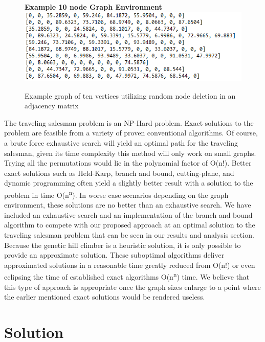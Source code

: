 \documentclass[sigplan,screen]{acmart}
\begin{document}
\begin{figure}[h]
    \centering
    \textbf{Example 10 node Graph Environment}
    \includegraphics[width=\columnwidth]{assets/graph.png}
    \caption{Example graph of ten vertices utilizing random node deletion in an adjacency matrix}
    \label{fig:example_graph}
\end{figure}

The traveling salesman problem is an NP-Hard problem. Exact solutions to the
problem are feasible from a variety of proven conventional algorithms. Of
course, a brute force exhaustive search will yield an optimal path for the
traveling salesman, given its time complexity this method will only work on
small graphs. Trying all the permutations would lie in the polynomial factor of
O(n!). Better exact solutions such as Held-Karp, branch and bound,
cutting-plane, and dynamic programming often yield a slightly better result with
a solution to the problem in time O(n\textsuperscript{n}). In worse case
scenarios depending on the graph environment, these solutions are no better than
an exhaustive search. We have included an exhaustive search and an
implementation of the branch and bound algorithm to compete with our proposed
approach at an optimal solution to the traveling salesman problem that can be
seen in our results and analysis section. Because the genetic hill climber is a
heuristic solution, it is only possible to provide an approximate solution.
These suboptimal algorithms deliver approximated solutions in a reasonable time
greatly reduced from O(n!) or even eclipsing the time of established exact
algorithms O(n\textsuperscript{n}) time. We believe that this type of approach
is appropriate once the graph sizes enlarge to a point where the earlier
mentioned exact solutions would be rendered useless.

\section{Solution}
\end{document}
